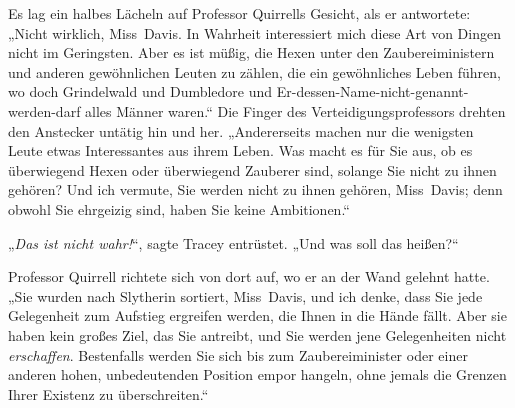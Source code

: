 Es lag ein halbes Lächeln auf Professor Quirrells Gesicht, als er antwortete:
„Nicht wirklich, Miss~Davis. In Wahrheit interessiert mich diese Art von Dingen nicht im Geringsten. Aber es ist müßig, die Hexen unter den Zaubereiministern und anderen gewöhnlichen Leuten zu zählen, die ein gewöhnliches Leben führen, wo doch Grindelwald und Dumbledore und Er-dessen-Name-nicht-genannt-werden-darf alles Männer waren.“ Die Finger des Verteidigungsprofessors drehten den Anstecker untätig hin und her.
„Andererseits machen nur die wenigsten Leute etwas Interessantes aus ihrem Leben. Was macht es für Sie aus, ob es überwiegend Hexen oder überwiegend Zauberer sind, solange Sie nicht zu ihnen gehören? Und ich vermute, Sie werden nicht zu ihnen gehören, Miss~Davis; denn obwohl Sie ehrgeizig sind, haben Sie keine Ambitionen.“

„\emph{Das ist nicht wahr!}“, sagte Tracey entrüstet.
„Und was soll das heißen?“

Professor Quirrell richtete sich von dort auf, wo er an der Wand gelehnt hatte.
„Sie wurden nach Slytherin sortiert, Miss~Davis, und ich denke, dass Sie jede Gelegenheit zum Aufstieg ergreifen werden, die Ihnen in die Hände fällt. Aber sie haben kein großes Ziel, das Sie antreibt, und Sie werden jene Gelegenheiten nicht \emph{erschaffen}. Bestenfalls werden Sie sich bis zum Zaubereiminister oder einer anderen hohen, unbedeutenden Position empor hangeln, ohne jemals die Grenzen Ihrer Existenz zu überschreiten.“


